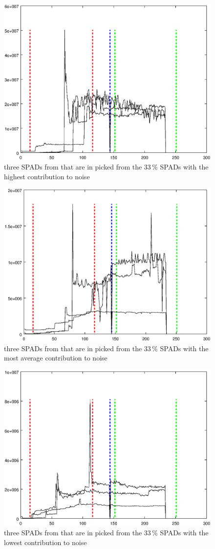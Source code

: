 \begin{figure}[h]
\centering
	\includegraphics[width=0.6\linewidth]{fig/spad_high.eps}
\caption{three SPADs from that are in picked from the $33\,\%$ SPADs with the highest contribution to noise}
\label{fig:spad_high}
\end{figure}


\begin{figure}[h]
\centering
	\includegraphics[width=0.6\linewidth]{fig/spad_mid.eps}
\caption{three SPADs from that are in picked from the $33\,\%$ SPADs with the most average contribution to noise}
\label{fig:spad_mid}
\end{figure}


\begin{figure}[h]
\centering
	\includegraphics[width=0.6\linewidth]{fig/spad_low.eps}
\caption{three SPADs from that are in picked from the $33\,\%$ SPADs with the lowest  contribution to noise}
\label{fig:spad_low}
\end{figure}

